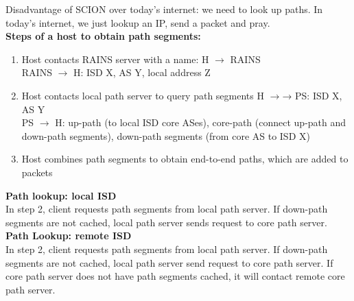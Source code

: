 \documentclass[11pt,oneside,a4paper]{article}
\begin{document}
Disadvantage of SCION over today's internet: we need to look up paths. In today's internet, we just lookup an IP, send a packet and pray.\\

\textbf{Steps of a host to obtain path segments:}

\vspace{-\topsep}
\begin{enumerate}
	\setlength{\itemsep}{0pt}
	\setlength{\parskip}{0pt}
	\item Host contacts RAINS server with a name: H $\rightarrow$ RAINS\\
	RAINS $\rightarrow$ H: ISD X, AS Y, local address Z
	\item Host contacts local path server to query path segments H $\rightarrow$→ PS: ISD X, AS Y\\
	PS $\rightarrow$ H: up-path (to local ISD core ASes), core-path (connect up-path and down-path
	segments), down-path segments (from core AS to ISD X)
	\item Host combines path segments to obtain end-to-end 	paths, which are added to packets\\
\end{enumerate}
\vspace{-\topsep}

\newpage

\textbf{Path lookup: local ISD}\\
In step 2, client requests path segments from local path server. If down-path segments are not cached, local path server sends request to core path server.\\

\textbf{Path Lookup: remote ISD}\\
In step 2, client requests path segments from local path server. If down-path segments are not cached, local path server send request to core path server. If core path server does not have path segments cached, it will contact remote core path server.
\end{document}
